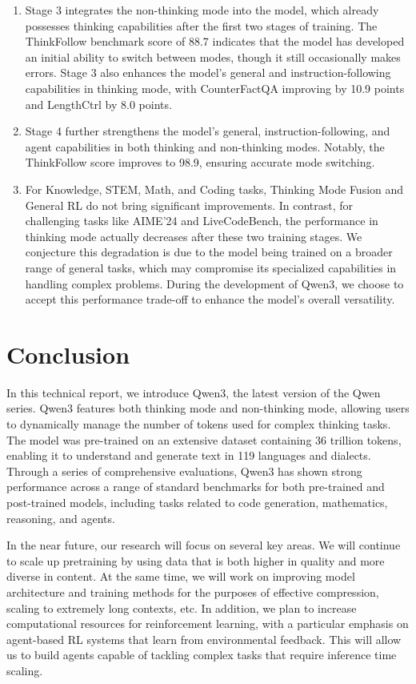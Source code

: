 \documentclass[dvipsnames]{article}
\begin{document}
\begin{enumerate}[label=(\arabic*)]
    \item Stage 3 integrates the non-thinking mode into the model, which already possesses thinking capabilities after the first two stages of training. The ThinkFollow benchmark score of 88.7 indicates that the model has developed an initial ability to switch between modes, though it still occasionally makes errors. Stage 3 also enhances the model's general and instruction-following capabilities in thinking mode, with CounterFactQA improving by 10.9 points and LengthCtrl by 8.0 points.
    
    \item Stage 4 further strengthens the model's general, instruction-following, and agent capabilities in both thinking and non-thinking modes. Notably, the ThinkFollow score improves to 98.9, ensuring accurate mode switching.
    
    \item For Knowledge, STEM, Math, and Coding tasks, Thinking Mode Fusion and General RL do not bring significant improvements. In contrast, for challenging tasks like AIME'24 and LiveCodeBench, the performance in thinking mode actually decreases after these two training stages. We conjecture this degradation is due to the model being trained on a broader range of general tasks, which may compromise its specialized capabilities in handling complex problems. During the development of Qwen3, we choose to accept this performance trade-off to enhance the model's overall versatility.
\end{enumerate}

\section{Conclusion}

In this technical report, we introduce Qwen3, the latest version of the Qwen series. Qwen3 features both thinking mode and non-thinking mode, allowing users to dynamically manage the number of tokens used for complex thinking tasks. The model was pre-trained on an extensive dataset containing 36 trillion tokens, enabling it to understand and generate text in 119 languages and dialects. Through a series of comprehensive evaluations, Qwen3 has shown strong performance across a range of standard benchmarks for both pre-trained and post-trained models, including tasks related to code generation, mathematics, reasoning, and agents.

In the near future, our research will focus on several key areas. We will continue to scale up pretraining by using data that is both higher in quality and more diverse in content. At the same time, we will work on improving model architecture and training methods for the purposes of effective compression, scaling to extremely long contexts, etc.
In addition, we plan to increase computational resources for reinforcement learning, with a particular emphasis on agent-based RL systems that learn from environmental feedback. This will allow us to build agents capable of tackling complex tasks that require inference time scaling.
\end{document}
